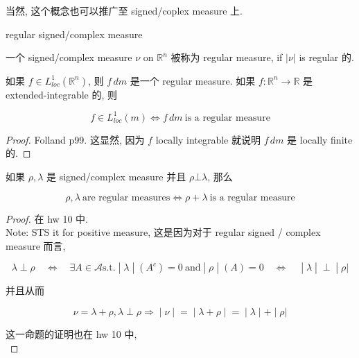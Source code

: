 \documentclass{qlnotes-export}
\begin{document}
当然, 这个概念也可以推广至 signed/coplex measure 上.

\begin{definition}{regular signed/complex measure}\label{def-12-differentiation-on-real-spaces-regular-signed-complex-measure}

一个 signed/complex measure \(\nu\) on \({\mathbb{R}}^{n}\) 被称为 regular measure, if \(|\nu|\) is regular 的.

\end{definition}

\begin{lemma}\label{lem-12-differentiation-on-real-spaces-lemma-001}

如果 \(f \in L_{loc}^{1}({\mathbb{R}}^{n})\), 则 \(f\, dm\) 是一个 regular measure. 如果 \(f:{\mathbb{R}}^{n}\rightarrow{\mathbb{R}}\) 是 extended-integrable 的, 则

\[f \in L_{loc}^{1}(m)\Leftrightarrow f\, dm\ \text{is a regular measure}\]

\end{lemma}

\begin{proof}

Folland p99. 这显然, 因为 \(f\) locally integrable 就说明 \(f\, dm\) 是 locally finite 的.

\end{proof}

\begin{lemma}\label{lem-12-differentiation-on-real-spaces-lemma-002}

如果 \(\rho,\lambda\) 是 signed/complex measure 并且 \(\rho\bot\lambda\), 那么

\[\rho,\lambda\ \text{are regular measures}\Leftrightarrow\rho + \lambda\ \text{is a regular measure}\]

\end{lemma}

\begin{proof}

在 hw 10 中.\\
Note: STS it for positive measure, 这是因为对于 regular signed / complex measure 而言,

\[\left. \lambda \perp \rho\quad\Leftrightarrow\quad\exists A \in \mathcal{A}\text{s.t.} \middle| \lambda \middle| (A^{c}) = 0\ \text{and} \middle| \rho \middle| (A) = 0\quad\Leftrightarrow\quad \middle| \lambda \middle| \perp \middle| \rho| \right.\]

并且从而

\[\left. \nu = \lambda + \rho,\lambda \perp \rho\Longrightarrow \middle| \nu \middle| = \middle| \lambda + \rho \middle| = \middle| \lambda \middle| + \middle| \rho| \right.\]

这一命题的证明也在 hw 10 中,\\

\end{proof}
\end{document}
